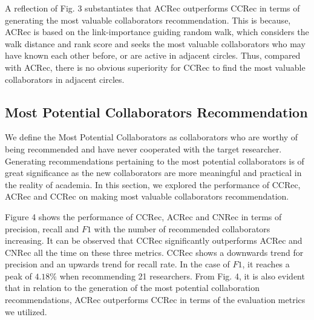 \documentclass[review]{elsarticle}
\begin{document}
A reflection of Fig. 3 substantiates that ACRec outperforms CCRec in terms of generating the most valuable collaborators recommendation. This is because, ACRec is based on the link-importance guiding random walk, which considers the walk distance and rank score and seeks the most valuable collaborators who may have known each other before, or are active in adjacent circles. Thus, compared with ACRec, there is no obvious superiority for CCRec to find the most valuable collaborators in adjacent circles.

\subsection{Most Potential Collaborators Recommendation}
We define the Most Potential Collaborators as collaborators who are worthy of being recommended and have never cooperated with the target researcher. Generating recommendations pertaining to the most potential collaborators is of great significance as the new collaborators are more meaningful and practical in the reality of academia. In this section, we explored the performance of CCRec, ACRec and CCRec on making most valuable collaborators recommendation.

Figure 4 shows the performance of CCRec, ACRec and CNRec in terms of precision, recall and $F1$ with the number of recommended collaborators increasing. It can be observed that CCRec significantly outperforms ACRec and CNRec all the time on these three metrics. CCRec shows a downwards trend for precision and an upwards trend for recall rate. In the case of $F1$, it reaches a peak of $4.18\%$ when recommending 21 researchers. From Fig. 4, it is also evident that in relation to the generation of the most potential collaboration recommendations, ACRec outperforms CCRec in terms of the evaluation metrics we utilized.
\end{document}
